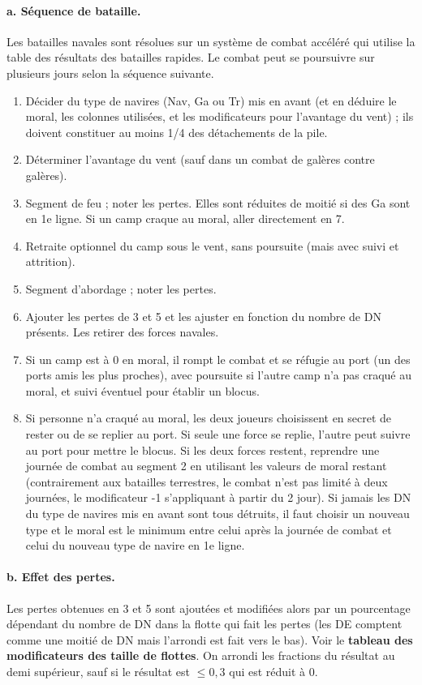 \paragraph{a. Séquence de bataille.}
Les batailles navales sont résolues sur un système de combat accéléré
qui utilise la table des résultats des batailles rapides. Le combat peut
se poursuivre sur plusieurs jours selon la séquence suivante.
\begin{enumerate}
\item Décider du type de navires (Nav, Ga ou Tr) mis en avant (et en déduire le moral,
les colonnes utilisées, et les modificateurs pour l'avantage du vent) ; ils
doivent constituer au moins 1/4 des détachements de la pile.
\item Déterminer l'avantage du vent (sauf dans un combat de galères
contre galères).
\item Segment de feu ; noter les pertes. Elles sont réduites de moitié
si des Ga sont en 1e ligne. Si un camp craque au moral,
aller directement en 7.
\item Retraite optionnel du camp sous le vent, sans poursuite (mais avec 
suivi et attrition). 
\item Segment d'abordage ; noter les pertes.
\item Ajouter les pertes de 3 et 5 et les ajuster en fonction du nombre de DN 
présents. Les retirer des forces navales.
\item Si un camp est à 0 en moral, il rompt le combat et se réfugie au port
(un des ports amis les plus proches), avec poursuite si l'autre camp n'a
pas craqué au moral, et suivi éventuel pour établir un blocus.
\item Si personne n'a craqué au moral, les deux joueurs choisissent en secret
de rester ou de se replier au port. Si seule une force se replie, l'autre peut suivre
au port pour mettre le blocus. Si les deux forces restent, reprendre une journée
de combat au segment 2 en utilisant les valeurs de moral restant
(contrairement aux batailles terrestres, le combat n'est pas limité à deux
journées, le modificateur -1 s'appliquant à partir du 2 jour).
Si jamais les DN du type de navires mis en avant sont tous détruits, il
faut choisir un nouveau type et le moral est le minimum entre celui après la journée
de combat et celui du nouveau type de navire en 1e ligne.
\end{enumerate}

\paragraph{b. Effet des pertes.}
Les pertes obtenues en 3 et 5 sont ajoutées et modifiées alors
par un pourcentage dépendant du nombre de DN dans la flotte
qui fait les pertes (les DE comptent comme une moitié de DN mais
l'arrondi est fait vers le bas). Voir le \textbf{tableau des modificateurs des
taille de flottes}. On arrondi les fractions du résultat au demi supérieur,
sauf si le résultat est $\le 0,3$ qui est réduit à 0. 

